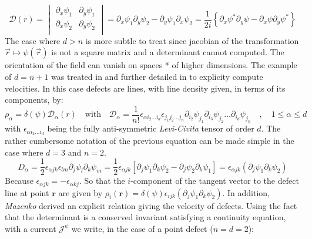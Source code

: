 \documentclass[11pt]{article}
\begin{document}
\begin{equation}
    \mathcal{D}(r)= \begin{vmatrix}
        \partial_x\psi_1 & \partial_y\psi_1\\ 
        \partial_x\psi_2 & \partial_y\psi_2\\
   \end{vmatrix} = \partial_x\psi_1 \partial_y\psi_2 - \partial_y\psi_1\partial_x\psi_2 = \frac{1}{2i} \left\lbrace \partial_x \psi^* \partial_y \psi -\partial_x \psi \partial_y \psi^*\right\rbrace
\end{equation}
The case where $d>n$ is more subtle to treat since jacobian of the transformation $\vec{r}\mapsto \psi(\vec{r})$ is not a square matrix and a determinant cannot computed. The orientation of the field can vanish on spaces * of higher dimensions. The example of $d=n+1$ was treated in \parencite{Halperin1981} and further detailed in \parencite{mazenkoVelocitydistribution1999} to explicity compute velocities. In this case defects are lines, with line density given, in terms of its components, by:
\begin{equation}
    \rho_\alpha =\delta(\psi)\mathcal D_\alpha(r) \quad \text{with} \quad \mathcal{D}_\alpha = \frac{1}{n!} \epsilon_{\alpha i_2\dots i_d}\epsilon_{j_1j_2\dots j_n} \partial_{i_2} \psi_{j_1}\partial_{i_3} \psi_{j_2} \dots \partial_{i_d} \psi_{j_n} \quad , \quad 1\leq\alpha\leq d
\end{equation}
with $\epsilon_{\alpha i_2\dots i_d}$ being the fully anti-symmetric \emph{Levi-Civita} tensor of order $d$. The rather cumbersome notation of the previous equation can be made simple in the case where $d=3$ and $n=2$. 
\begin{equation}
    {D}_\alpha = \frac{1}{2} \epsilon_{\alpha jk}\epsilon_{lm} \partial_{j} \psi_{l}\partial_{k} \psi_{m} = \frac{1}{2} \epsilon_{\alpha jk} \left[ \partial_j \psi_1 \partial_k \psi_2 - \partial_j \psi_2 \partial_k \psi_1 \right] =   \epsilon_{\alpha jk}\left(\partial_j \psi_1 \partial_k \psi_2\right)
\end{equation}
Because $\epsilon_{\alpha jk} = -\epsilon_{\alpha kj}$. So that the $i$-component of the tangent vector to the defect line at point $\bm r$ are given by $\rho_i(\bm r) = \delta(\psi ) \epsilon_{i jk}\left(\partial_j \psi_1 \partial_k \psi_2\right)$. In addition, \emph{Mazenko} \parencite{mazenkoVortexVelocities1997} derived an explicit relation giving the velocity of defects. Using the fact that the determinant is a conserved invariant satisfying a continuity equation, with a current $\bm{\mathcal{J}}^\psi$ we write, in the case of a point defect ($n=d=2$):
\end{document}
